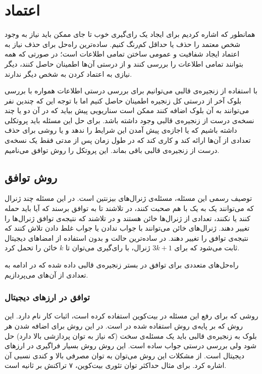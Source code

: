 \section{اعتماد}
همانطور که اشاره کردیم برای ایجاد یک رای‌گیری خوب تا جای ممکن باید نیاز به وجود شخص معتمد را حذف یا حداقل کم‌رنگ کنیم. ساده‌ترین راه‌حل برای حذف نیاز به اعتماد ایجاد شفافیت و عمومی ساختن تمامی اطلاعات است؛ در صورتی که همه بتوانند تمامی اطلاعات را بررسی کنند و از درستی آن‌ها اطمینان حاصل کنند، دیگر نیازی به اعتماد کردن به شخص دیگر ندارند. 
\par 
با استفاده از زنجیره‌ی قالبی می‌‌توانیم برای بررسی درستی اطلاعات همواره با بررسی بلوک آخر از درستی کل زنجیره اطمینان حاصل کنیم اما با توجه این که چندین نفر می‌توانند به آن بلوک اضافه کنند ممکن است سناریویی پیش بیاید که در آن دو یا چند نسخه‌ی درست از زنجیره‌ی قالبی وجود داشته باشد. برای حل این مسئله باید پروتکلی داشته باشیم که یا اجازه‌ی پیش آمدن این شرایط را ندهد و یا روشی برای حذف تعدادی از آن‌ها ارائه کند و کاری کند که در طول زمان پس از مدتی فقط یک نسخه‌ی درست از زنجیره‌ی قالبی باقی بماند. این پروتکل را روش توافق می‌نامیم.
\subsection{روش توافق}
توصیف رسمی این مسئله، مسئله‌ی ژنرال‌های بیزنتین 
\cite{byzantine}
است. در این مسئله چند ژنرال که می‌توانند یک به یک با هم صحبت کنند، در تلاشند تا به توافق برسند که آیا باید حمله کنند یا نکنند، تعدادی از ژنرال‌ها خائن هستند و در تلاشند که نتیجه‌ی توافق ژنرال‌ها را تغییر دهند. ژنرال‌های خائن می‌توانند با جواب ندادن یا جواب غلط دادن تلاش کنند که نتیجه‌ی توافق را تغییر دهند. در ساده‌ترین حالت و بدون استفاده از امضا‌های دیجیتال ثابت می‌شود که برای $ 3k + 1 $ ژنرال، با رای‌گیری می‌توان تا $ k $ خائن را تحمل کرد. 
\par
راه‌حل‌های متعددی برای توافق 
در بستر زنجیره‌ی قالبی داده شده که در ادامه به تعدادی از آن‌های می‌پردازیم.
\subsubsection{توافق در ارزهای دیجیتال}
روشی که 
\cite{bitcoin}
برای رفع این مسئله در بیت‌کوین استفاده کرده است، اثبات کار 
نام دارد. این روش که بر پایه‌ی روش استفاده شده در 
\cite{hashcash}
است. در این روش برای اضافه شدن هر بلوک به زنجیره‌ی قالبی باید یک مسئله‌ی سخت (که نیاز به توان پردازشی بالا دارد) حل شود ولی بررسی درستی جواب ساده است. این روش روش بسیار فراگیری در ارز‌های دیجیتال است. از مشکلات این روش می‌توان به توان مصرفی بالا و کندی نسبی آن اشاره کرد. برای مثال حداکثر توان تئوری بیت‌کوین، ۷ تراکنش بر ثانیه است. 

